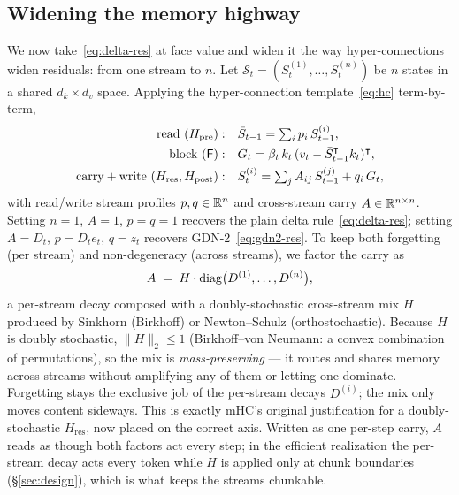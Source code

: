 \documentclass[11pt,letterpaper,logo]{yalearxiv}
\newcommand{\Hres}{H_{\mathrm{res}}}
\newcommand{\Hpre}{H_{\mathrm{pre}}}
\newcommand{\Hpost}{H_{\mathrm{post}}}
\newcommand{\Sbb}{\boldsymbol{\mathcal{S}}}    %
\newcommand{\Fdelta}{\mathsf{F}}               %
\begin{document}
\subsection{Widening the memory highway}
We now take~\eqref{eq:delta-res} at face value and widen it the way
hyper-connections widen residuals: from one stream to $n$. Let
$\Sbb_{t} = (S_t^{(1)},\dots,S_t^{(n)})$ be $n$ states in a shared
$d_k \times d_v$ space. Applying the hyper-connection template~\eqref{eq:hc}
term-by-term,
\begin{align}
  \text{read } (\Hpre): \quad
    & \bar S_{t-1} = \textstyle\sum_i p_i\, S_{t-1}^{(i)},
    \label{eq:b-read}\\
  \text{block } (\Fdelta): \quad
    & G_t = \beta_t\, k_t\,(v_t - \bar S_{t-1}^{\tr} k_t)^{\tr},
    \label{eq:b-block}\\
  \text{carry}+\text{write } (\Hres,\Hpost): \quad
    & S_t^{(i)} = \textstyle\sum_j A_{ij}\, S_{t-1}^{(j)} + q_i\, G_t ,
    \label{eq:b-update}
\end{align}
with read/write stream profiles $p, q \in \mathbb{R}^n$ and cross-stream carry
$A \in \mathbb{R}^{n\times n}$. Setting $n=1$, $A=1$, $p=q=1$ recovers the plain delta
rule~\eqref{eq:delta-res}; setting $A = D_t$, $p = D_t e_t$, $q = z_t$ recovers
GDN-2~\eqref{eq:gdn2-res}. To keep both forgetting (per stream) and
non-degeneracy (across streams), we factor the carry as
\begin{equation}
  A \;=\; H \cdot \operatorname{diag}\!\big(D^{(1)},\dots,D^{(n)}\big),
  \label{eq:carry-factor}
\end{equation}
a per-stream decay composed with a doubly-stochastic cross-stream mix $H$ produced
by Sinkhorn (Birkhoff) or Newton--Schulz (orthostochastic). Because $H$ is doubly
stochastic, $\|H\|_2 \le 1$ (Birkhoff--von Neumann: a convex combination of
permutations), so the mix is \emph{mass-preserving} --- it routes and shares
memory across streams without amplifying any of them or letting one dominate.
Forgetting stays the exclusive job of the per-stream decays $D^{(i)}$; the mix
only moves content sideways. This is exactly mHC's original justification for a
doubly-stochastic $\Hres$, now placed on the correct axis. Written as one per-step
carry, $A$ reads as though both factors act every step; in the efficient
realization the per-stream decay acts every token while $H$ is applied only at
chunk boundaries (\S\ref{sec:design}), which is what keeps the streams chunkable.


\end{document}

